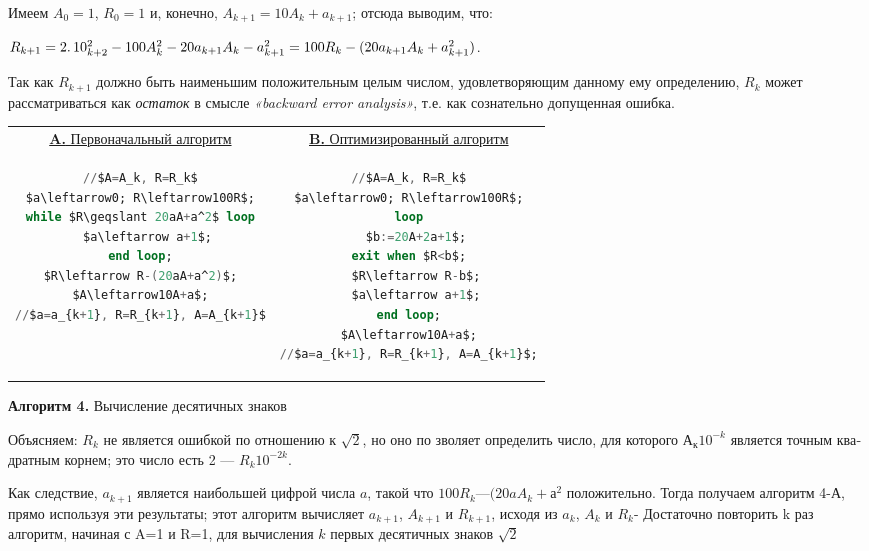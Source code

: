 Имеем $A_{0} = 1$, $R_{0} = 1$ и, конечно, $A_{k+1} = 10A_{k} + a_{k+1}$; отсюда выводим, что:
\begin{center}
$R_{k+1} = 2\ldotp 10^{2}_{k+2} - 100A^{2}_{k} - 20a_{k+1}A_{k} - a^{2}_{k+1} = 100R_{k} - (20a_{k+1}A_{k} + a^{2}_{k+1})$.
\end{center}
Так как $R_{k+1}$ должно быть наименьшим положительным целым числом, удовлетворяющим данному ему определению, $R_{k}$ может рассматриваться как \textit{остаток} в смысле \textit{«backward error analysis»}, т.е. как сознательно допущенная ошибка.
\begin{table}[h!]
\centering
\begin{tabular}{|c|c|}
\hline
\underline{\textbf{A.} Первоначальный алгоритм} & \underline{\textbf{B.} Оптимизированный алгоритм} \\
{\begin{lstlisting}[mathescape=true, language=Ada, frame=none]
//$A=A_k, R=R_k$
$a\leftarrow0; R\leftarrow100R$;
while $R\geqslant 20aA+a^2$ loop
  $a\leftarrow a+1$;
end loop;
$R\leftarrow R-(20aA+a^2)$;
$A\leftarrow10A+a$;
//$a=a_{k+1}, R=R_{k+1}, A=A_{k+1}$
\end{lstlisting}}
&
{\begin{lstlisting}[mathescape=true, language=Ada, frame=none]
//$A=A_k, R=R_k$
$a\leftarrow0; R\leftarrow100R$;
loop
  $b:=20A+2a+1$;
exit when $R<b$;
  $R\leftarrow R-b$;
  $a\leftarrow a+1$;
end loop;
$A\leftarrow10A+a$;
//$a=a_{k+1}, R=R_{k+1}, A=A_{k+1}$;
\end{lstlisting}}
\\ \hline
\end{tabular}
\end{table}
\begin{center}
\textbf{Алгоритм 4.} Вычисление десятичных знаков
\end{center}
\newpage

Объясняем: $R_{k}$ не является ошибкой по отношению  к $\sqrt{2}$,
  но  оно  по­
зволяет определить  число,  для  которого $А_{к}10^{-k}$
  является  точным  ква­
дратным  корнем;  это число есть  2 — $R_{k}10^{-2k}$.

Как следствие,  $a_{k+1}$  является  наибольшей  цифрой  числа $a$,
  такой 
что  $100R_{k} — (20aA_{k} +  а^{2}$
положительно. Тогда получаем  алгоритм 4-А, 
прямо используя эти  результаты;  этот алгоритм вычисляет  $a_{k+1}$,  $A_{k+1}$ и $R_{k+1}$,
  исходя  из 
$a_{k}$, $A_{k}$ и $R_{k}$-
  Достаточно повторить k
  раз  алгоритм, 
начиная  с 
A=1  и 
R=1,  для  вычисления 
$k$ первых  десятичных  зна­ков $\sqrt{2}$

